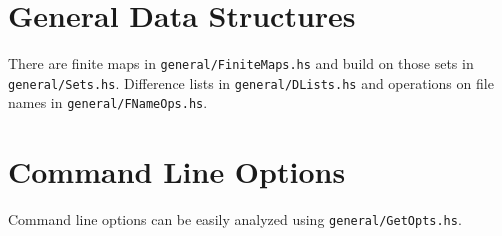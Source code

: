 \documentclass{report}
\newcommand{\code}[1]{\texttt{#1}}
\begin{document}
\section{General Data Structures}

There are finite maps in \code{general/FiniteMaps.hs} and build on those sets
in \code{general/Sets.hs}.  Difference lists in \code{general/DLists.hs} and
operations on file names in \code{general/FNameOps.hs}.


\section{Command Line Options}

Command line options can be easily analyzed using \code{general/GetOpts.hs}.




\end{document}
